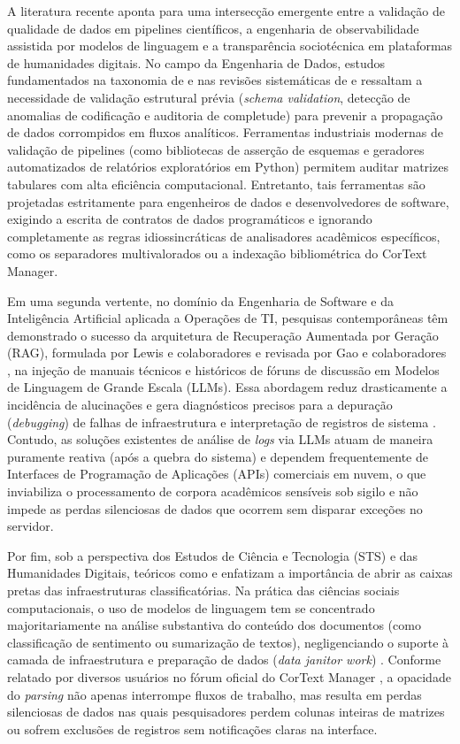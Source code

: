 \documentclass[
	oneside,
	a4paper,
	12pt,
	chapter=TITLE,
	section=TITLE,
	english,
	brazilian
]{abntex2}
\begin{document}
A literatura recente aponta para uma intersecção emergente entre a validação de qualidade de dados em pipelines científicos, a engenharia de observabilidade assistida por modelos de linguagem e a transparência sociotécnica em plataformas de humanidades digitais. No campo da Engenharia de Dados, estudos fundamentados na taxonomia de  e nas revisões sistemáticas de  e  ressaltam a necessidade de validação estrutural prévia (\textit{schema validation}, detecção de anomalias de codificação e auditoria de completude) para prevenir a propagação de dados corrompidos em fluxos analíticos. Ferramentas industriais modernas de validação de pipelines (como bibliotecas de asserção de esquemas e geradores automatizados de relatórios exploratórios em Python) permitem auditar matrizes tabulares com alta eficiência computacional. Entretanto, tais ferramentas são projetadas estritamente para engenheiros de dados e desenvolvedores de software, exigindo a escrita de contratos de dados programáticos e ignorando completamente as regras idiossincráticas de analisadores acadêmicos específicos, como os separadores multivalorados ou a indexação bibliométrica do CorText Manager.

Em uma segunda vertente, no domínio da Engenharia de Software e da Inteligência Artificial aplicada a Operações de TI, pesquisas contemporâneas têm demonstrado o sucesso da arquitetura de Recuperação Aumentada por Geração (RAG), formulada por Lewis e colaboradores \cite{Lewis2020} e revisada por Gao e colaboradores \cite{Gao2023}, na injeção de manuais técnicos e históricos de fóruns de discussão em Modelos de Linguagem de Grande Escala (LLMs). Essa abordagem reduz drasticamente a incidência de alucinações \cite{Ji2023} e gera diagnósticos precisos para a depuração (\textit{debugging}) de falhas de infraestrutura e interpretação de registros de sistema \cite{Majors2022}. Contudo, as soluções existentes de análise de \textit{logs} via LLMs atuam de maneira puramente reativa (após a quebra do sistema) e dependem frequentemente de Interfaces de Programação de Aplicações (APIs) comerciais em nuvem, o que inviabiliza o processamento de corpora acadêmicos sensíveis sob sigilo e não impede as perdas silenciosas de dados que ocorrem sem disparar exceções no servidor.

Por fim, sob a perspectiva dos Estudos de Ciência e Tecnologia (STS) e das Humanidades Digitais, teóricos como  e  enfatizam a importância de abrir as caixas pretas das infraestruturas classificatórias. Na prática das ciências sociais computacionais, o uso de modelos de linguagem tem se concentrado majoritariamente na análise substantiva do conteúdo dos documentos (como classificação de sentimento ou sumarização de textos), negligenciando o suporte à camada de infraestrutura e preparação de dados (\textit{data janitor work}) \cite{DIgnazio2020}. Conforme relatado por diversos usuários no fórum oficial do CorText Manager \cite{CorText2026}, a opacidade do \textit{parsing} não apenas interrompe fluxos de trabalho, mas resulta em perdas silenciosas de dados nas quais pesquisadores perdem colunas inteiras de matrizes ou sofrem exclusões de registros sem notificações claras na interface.
\end{document}
